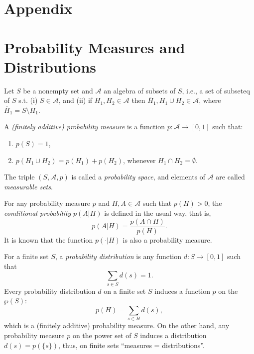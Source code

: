 \section*{Appendix}
\appendix

\section{Probability Measures and Distributions}



Let $S$ be a nonempty set and $\mathcal{A}$ an algebra of subsets of $S$, 
i.e., a set of subseteq of $S$ s.t. (i) $S \in \mathcal{A}$, 
and (ii) if $H_1,H_2 \in \mathcal{A}$ then $\overline{H}_1, H_1 \cup H_2 \in \mathcal{A}$, 
where $\overline{H}_1=S\setminus H_1$.



A \textit{(finitely additive) probability measure} is a function $p \colon \mathcal{A} \to [0,1]$ such that:
\begin{enumerate}[itemsep=5pt,parsep=5pt,leftmargin=3em,topsep=5pt,label=(\arabic*)] %
    \item $p(S)=1$,
    
    \item $p(H_1 \cup H_2) = p(H_1)+p(H_2)$, 
    whenever $H_1 \cap H_2 = \emptyset$.
\end{enumerate}


The triple $(S,\mathcal{A},p)$ is called a \textit{probability space}, 
and elements of $\mathcal{A}$ are called \textit{measurable sets}.



For any probability measure $p$ and $H,A \in \mathcal{A}$ such that $p(H)>0$, 
the \textit{conditional probability} $p(A | H)$ is defined in the usual way, that is, 
\[
    p(A | H) = \dfrac{p(A \cap H)}{p(H)}. 
\]
It is known that the function $p(\cdot | H)$ is also a probability measure.





For a finite set $S$, 
a \textit{probability distribution} is any  function $d\colon S \to [0,1]$ such that 
\[
    \sum_{s \in S} d(s) = 1.
\]
Every probability distribution $d$ on a finite set $S$ induces a function $p$ on the $\wp(S)$:
\[
    p(H) = \sum_{s \in H} d(s),
\]
which is a (finitely additive) probability measure. 
% 
On the other hand,
any probability measure $p$ on the power set of $S$ induces a distribution $d(s)=p(\{s\})$, 
thus, 
on finite sets ``measures = distributions''.



    
